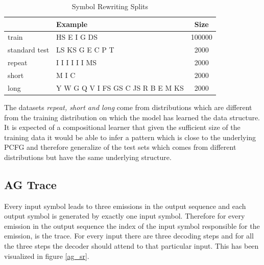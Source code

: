 \begin{table}[ht]
	\centering
	\begin{tabular}{l|lc}
		& Example & Size\\
		\hline
		train & HS E I G DS  & 100000 \\
		standard test & LS KS G E C P T & 2000 \\
		repeat & I I I I I I MS & 2000 \\
		short & M I C & 2000 \\
		long & Y W G Q V I FS GS C JS R B E M KS & 2000 \\
	\end{tabular}
	\caption{Symbol Rewriting Splits}
	\label{sr:stats}
\end{table}

The datasets \textit{repeat, short and long} come from distributions which are different from the training distribution on which the model has learned the data structure. It is expected of a compositional learner that given the sufficient size of the training data it would be able to infer a pattern which is close to the underlying PCFG and therefore generalize of the test sets which comes from different distributions but have the same underlying structure.

\subsection{AG Trace}
Every input symbol leads to three emissions in the output sequence and each output symbol is generated by exactly one input symbol. Therefore for every emission in the output sequence the index of the input symbol responsible for the emission, is the trace. For every input there are three decoding steps and for all the three steps the decoder should attend to that particular input. This has been visualized in figure \ref{ag_sr}.

